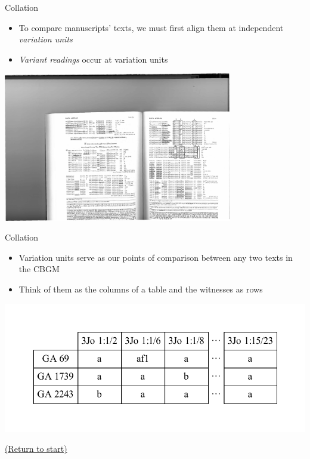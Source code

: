 \documentclass[10pt]{beamer}
\begin{document}
	\begin{frame}{Collation}\label{slide:collation}
		\begin{itemize}
			\item To compare manuscripts' texts, we must first align them at independent \emph{variation units}
			\item \emph{Variant readings} occur at variation units
		\end{itemize}
		\begin{center}
			\includegraphics[width=0.75\textwidth]{../graphics/swanson-luke-10-2-variation-units.pdf}
		\end{center}
		\footnotesize\parencite[Source:][183]{Swanson.Luke}
	\end{frame}
	\begin{frame}{Collation}
		\begin{itemize}
			\item Variation units serve as our points of comparison between any two texts in the CBGM
			\item Think of them as the columns of a table and the witnesses as rows
		\end{itemize}
		\begin{center}
			\includegraphics[scale=0.5]{../graphics/witnesses.pdf}
		\end{center}
		\begin{center}
			\hyperlink{slide:crossroad}{(Return to start)}
		\end{center}
	\end{frame}
\end{document}
